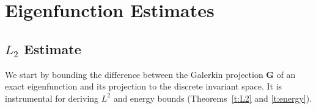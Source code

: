 \documentclass{siamart0516}
\newcommand{\bG}{\ensuremath{\boldsymbol G}}
\numberwithin{equation}{section}
\numberwithin{theorem}{section}
\numberwithin{figure}{section}
\begin{document}


\section{Eigenfunction Estimates} \label{sec4}
\subsection{$L_2$ Estimate}

We start by bounding the difference between the Galerkin projection $\bG$ of an exact eigenfunction and its projection to the discrete invariant space. 
It is instrumental for deriving  $L^2$ and energy bounds (Theorems~\ref{t:L2} and \ref{t:energy}).
\end{document}
